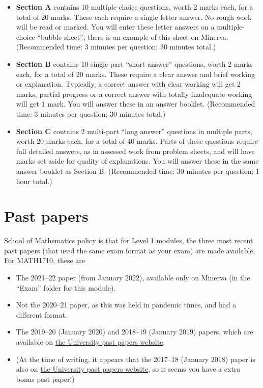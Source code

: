 \documentclass[
  letterpaper,
  DIV=11,
  numbers=noendperiod]{scrreprt}
\providecommand{\tightlist}{%
  \setlength{\itemsep}{0pt}\setlength{\parskip}{0pt}}\usepackage{longtable,booktabs,array}
\theoremstyle{remark}
\begin{document}
\begin{itemize}
\tightlist
\item
  \textbf{Section A} contains 10 multiple-choice questions, worth 2
  marks each, for a total of 20 marks. These each require a single
  letter answer. No rough work will be read or marked. You will enter
  these letter answers on a multiple-choice ``bubble sheet''; there is
  an example of this sheet on Minerva. (Recommended time: 3 minutes per
  question; 30 minutes total.)
\item
  \textbf{Section B} contains 10 single-part ``short answer'' questions,
  worth 2 marks each, for a total of 20 marks. These require a clear
  answer and brief working or explanation. Typically, a correct answer
  with clear working will get 2 marks; partial progress or a correct
  answer with totally inadequate working will get 1 mark. You will
  answer these in an answer booklet. (Recommended time: 3 minutes per
  question; 30 minutes total.)
\item
  \textbf{Section C} contains 2 multi-part ``long answer'' questions in
  multiple parts, worth 20 marks each, for a total of 40 marks. Parts of
  these questions require full detailed answers, as in assessed work
  from problem sheets, and will have marks set aside for quality of
  explanations. You will answer these in the same answer booklet as
  Section B. (Recommended time: 30 minutes per question; 1 hour total.)
\end{itemize}

\hypertarget{past-papers}{%
\section{Past papers}\label{past-papers}}

School of Mathematics policy is that for Level 1 modules, the three most
recent past papers (that used the same exam format as your exam) are
made available. For MATH1710, these are

\begin{itemize}
\tightlist
\item
  The 2021--22 paper (from January 2022), available only on Minerva (in
  the ``Exam'' folder for this module).
\item
  Not the 2020--21 paper, as this was held in pandemic times, and had a
  different format.
\item
  The 2019--20 (January 2020) and 2018--19 (January 2019) papers, which
  are available on
  \href{https://students.leeds.ac.uk/exampapers?action=search\&keyword=MATH1710}{the
  University past papers website}.
\item
  (At the time of writing, it appears that the 2017--18 (January 2018)
  paper is also on
  \href{https://students.leeds.ac.uk/exampapers?action=search\&keyword=MATH1710}{the
  University past papers website}, so it seems you have a extra bonus
  past paper!)
\end{itemize}
\end{document}
